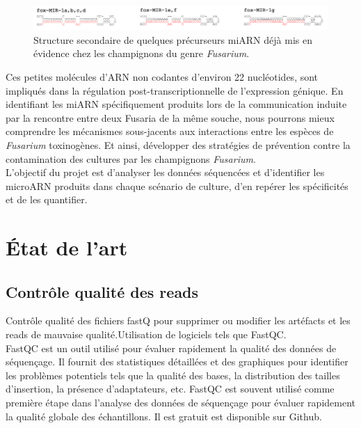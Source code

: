 \documentclass{report}
\begin{document}
\begin{figure}[h]
    \centering
    \includegraphics[width=1\textwidth]{Images/fig_3.png}
    \caption{Structure secondaire de quelques précurseurs miARN déjà mis en évidence chez les champignons du genre \textit{Fusarium}.\cite{chen2014exploring}}
    \label{fig:mirna}
\end{figure}

Ces petites molécules d'ARN non codantes d'environ 22 nucléotides, sont impliqués dans la régulation post-transcriptionnelle de l'expression génique. En identifiant les miARN spécifiquement produits lors de la communication induite par la rencontre entre deux Fusaria de la même souche, nous pourrons mieux comprendre les mécanismes sous-jacents aux interactions entre les espèces de \textit{Fusarium} toxinogènes. Et ainsi, développer des stratégies de prévention contre la contamination des cultures par les champignons \textit{Fusarium}. \cite{ponts2009fusarium, mycsa} \\

L’objectif du projet est d’analyser les données séquencées et d’identifier les microARN produits dans chaque scénario de culture, d’en repérer les spécificités et de les quantifier.

\section{État de l'art}

\subsection{Contrôle qualité des reads}
Contrôle qualité des fichiers fastQ pour supprimer ou modifier les artéfacts et les reads de mauvaise qualité.Utilisation de logiciels tels que FastQC.\\

FastQC est un outil utilisé pour évaluer rapidement la qualité des données de séquençage. Il fournit des statistiques détaillées et des graphiques pour identifier les problèmes potentiels tels que la qualité des bases, la distribution des tailles d'insertion, la présence d'adaptateurs, etc.
FastQC est souvent utilisé comme première étape dans l'analyse des données de séquençage pour évaluer rapidement la qualité globale des échantillons. Il est gratuit est disponible sur Github.\cite{fastqc} \\
\end{document}

